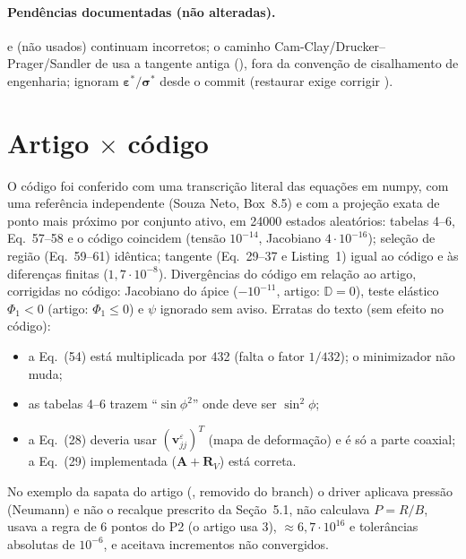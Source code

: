\documentclass[11pt,a4paper]{article}
\newcommand{\sig}{\bm{\sigma}}
\newcommand{\eps}{\bm{\varepsilon}}
\newcommand{\D}{\mathbb{D}}
\begin{document}
\paragraph{Pendências documentadas (não alteradas).} 
e  (não usados) continuam incorretos; o caminho Cam-Clay/Drucker--Prager/Sandler de
 usa a tangente antiga (), fora da convenção de cisalhamento
de engenharia;  ignoram $\eps^*/\sig^*$ desde o
commit  (restaurar exige corrigir ).

\section{Artigo $\times$ código}

O código foi conferido com uma transcrição literal das equações em numpy, com uma referência
independente (Souza Neto, Box~8.5) e com a projeção exata de ponto mais próximo por conjunto ativo,
em \num{24000} estados aleatórios: tabelas 4--6, Eq.~57--58 e o código coincidem (tensão $10^{-14}$,
Jacobiano $4\cdot10^{-16}$); seleção de região (Eq.~59--61) idêntica; tangente (Eq.~29--37 e Listing~1)
igual ao código e às diferenças finitas ($1{,}7\cdot10^{-8}$). Divergências do código em relação ao
artigo, corrigidas no código: Jacobiano do ápice ($-10^{-11}$, artigo: $\D=0$), teste elástico
$\Phi_1<0$ (artigo: $\Phi_1\le0$) e $\psi$ ignorado sem aviso. Erratas do texto (sem efeito no código):
\begin{itemize}
\item a Eq.~(54) está multiplicada por 432 (falta o fator $1/432$); o minimizador não muda;
\item as tabelas 4--6 trazem ``$\sin\phi^2$'' onde deve ser $\sin^2\phi$;
\item a Eq.~(28) deveria usar $(\mathbf v^{\varepsilon}_{jj})^T$ (mapa de deformação) e é só a parte
  coaxial; a Eq.~(29) implementada ($\mathbf A+\mathbf R_V$) está correta.
\end{itemize}
No exemplo da sapata do artigo (, removido do branch) o
driver aplicava pressão (Neumann) e não o recalque prescrito da Seção~5.1, não calculava $P=R/B$, usava
a regra de 6 pontos do P2 (o artigo usa 3),  $\approx6{,}7\cdot10^{16}$ e tolerâncias
absolutas de $10^{-6}$, e aceitava incrementos não convergidos.
\end{document}
